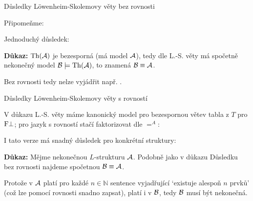 \documentclass{beamer}
\begin{document}
\begin{frame}{Důsledky Löwenheim-Skolemovy věty bez rovnosti}

    \pause
    Připomeňme:

    \smallskip

    \pause

    \medskip

    \pause
    Jednoduchý důsledek:

    \smallskip

    \pause

    \pause
    \textbf{Důkaz:} $\operatorname{Th}(\mathcal{A})$ je bezesporná (má model $\mathcal{A}$), tedy dle L.-S. věty má spočetně nekonečný model $\mathcal{B}\models\operatorname{Th}(\mathcal{A})$, to znamená $\mathcal{B}\equiv\mathcal{A}$.\hfill\qedsymbol

    \medskip

    \pause
    Bez rovnosti tedy nelze vyjádřit např. .

\end{frame}


\begin{frame}{Důsledky Löwenheim-Skolemovy věty s rovností}

    \pause
    V důkazu L.-S. věty máme kanonický model pro bezespornou větev tabla z $T$ pro $\mathrm{F}\bot$; pro jazyk s rovností stačí faktorizovat dle $=^A$:

    \smallskip

    \pause

    \medskip

    \pause
    I tato verze má snadný důsledek pro konkrétní struktury:

    \smallskip

    \pause

    \smallskip

    \pause
    \textbf{Důkaz:}
    Mějme nekonečnou $L$-strukturu $\mathcal{A}$. Podobně jako v důkazu Důsledku bez rovnosti najdeme \alert{spočetnou} $\mathcal{B}\equiv\mathcal{A}$. 
    
    \pause
    Protože v $\mathcal{A}$ platí pro každé $n\in\mathbb N$ sentence vyjadřující `existuje alespoň $n$ prvků' (což lze pomocí rovnosti snadno zapsat), platí i v $\mathcal{B}$, tedy $\mathcal{B}$ musí být nekonečná.\hfill\qedsymbol

\end{frame}
\end{document}
